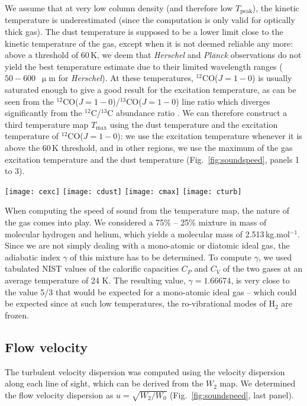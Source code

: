 \documentclass[structabstract]{aa}
\newcommand{\emm}[1]{\ensuremath{#1}}
\newcommand{\emr}[1]{\emm{\mathrm{#1}}}
\newcommand{\unit}[1]{\emr{\,#1}}
\newcommand{\micron}{\unit{\upmu m}}
\newcommand{\FigSoundSpeed}{%
  \begin{figure*}
    \centering
    \texttt{[image: cexc]}
    \texttt{[image: cdust]}
    \texttt{[image: cmax]}
    \texttt{[image: cturb]}
    \caption{First three panels: speed of sound computed for the estimated excitation temperature of the gas, the dust temperature, and the maximum of the two previous ones. Last panel: turbulent flow velocity dispersion. We assume that having one or several spectral components along the line of sight is irrelevant, since one component gives a turbulent velocity dispersion, and two components show a high-velocity shock.}
    \label{fig:soundspeed}
  \end{figure*}}
\begin{document}
\begin{appendix}
We assume that at very low column density (and therefore low $T_\emr{peak}$), the kinetic temperature is underestimated (since the computation is only valid for optically thick gas). The dust temperature is supposed to be a lower limit close to the kinetic temperature of the gas, except when it is not deemed reliable any more: above a threshold of 60\,K, we deem that \emph{Herschel} and \emph{Planck} observations do not yield the best temperature estimate due to their limited wavelength ranges ($50-600$ \micron{} for \emph{Herschel}). At these temperatures, $^{12}$CO($J=1-0$) is usually saturated enough to give a good result for the excitation temperature, as can be seen from the $^{12}$CO($J=1-0$)/$^{13}$CO($J=1-0$) line ratio which diverges significantly from the $^{12}$C/$^{13}$C abundance ratio \citep{pety16,ripple13}.  We can therefore construct a third temperature map $T_\emr{max}$ using the dust temperature and the excitation temperature of $^{12}$CO($J=1-0$): we use the excitation temperature whenever it is above the 60\,K threshold, and in other regions, we use the maximum of the gas excitation temperature and the dust temperature (Fig.~\ref{fig:soundspeed}, panels 1 to 3).

\FigSoundSpeed{} %

When computing the speed of sound from the temperature map, the nature of the gas comes into play. We considered a 75\% -- 25\% mixture in mass of molecular hydrogen and helium, which yields a molecular mass of 2.513\,kg.mol$^{-1}$. Since we are not simply dealing with a mono-atomic or diatomic ideal gas, the adiabatic index $\gamma$ of this mixture has to be determined. To compute $\gamma$, we used tabulated NIST values of the calorific capacities $C_P$ and $C_V$ of the two gases at an average temperature of 24 K. The resulting value, $\gamma = 1.66674$, is very close to the value 5/3 that would be expected for a mono-atomic ideal gas -- which could be expected since at such low temperatures, the ro-vibrational modes of H$_2$ are frozen.

\subsection{Flow velocity}
The turbulent velocity dispersion was computed using the velocity dispersion along each line of sight, which can be derived from the $W_2$ map. We determined the flow velocity dispersion as $u = \sqrt{W_2/W_0}$ (Fig.~\ref{fig:soundspeed}, last panel).


\end{appendix}
\end{document}
